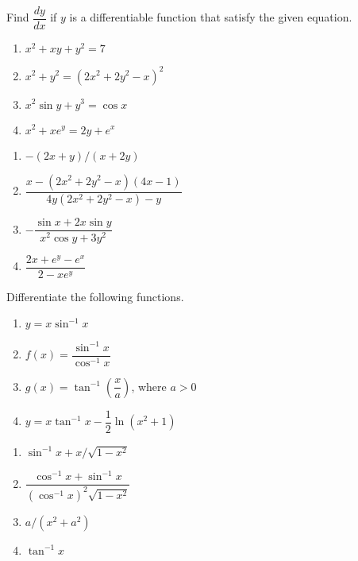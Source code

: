 \begin{enumialphparenastyle}
\begin{ex}
Find $\dfrac{dy}{dx}$ if $y$ is a differentiable
function that satisfy the given equation.
\begin{enumerate}
	\item	$x^2+xy+y^2=7$
	\item	$x^2+y^2=(2x^2+2y^2-x)^2$
	\item	$x^2\sin y+y^3=\cos x$
	\item	$x^2+xe^y=2y+e^x$
\end{enumerate}
\begin{sol}
\begin{enumerate}
	\item	$-(2x+y)/(x+2y)$
	\item	$\dfrac{x-(2x^2+2y^2-x) (4x-1)}{4y(2x^2+2y^2-x)-y}$
	\item	$-\dfrac{\sin x+2x\sin y}{x^2\cos y+3y^2}$
	\item	$\dfrac{2x+e^y-e^x}{2-xe^y}$
\end{enumerate}
\end{sol}
\end{ex}

\begin{ex}
Differentiate the following functions.
\begin{enumerate}
	\item	$y=x\sin^{-1}x$
	\item	$f(x)=\dfrac{\sin^{-1}x}{\cos^{-1}x}$
	\item	$g(x)=\tan^{-1}\left(\dfrac{x}{a}\right)$, where $a>0$
	\item	$y=x\tan^{-1}x-\dfrac{1}{2}\ln(x^2+1)$
\end{enumerate}
\begin{sol}
\begin{enumerate}
	\item	$\sin^{-1}x+x/\sqrt{1-x^2}$
	\item	$\dfrac{\cos^{-1}x+\sin^{-1}x}{(\cos^{-1}x)^2 \sqrt{1-x^2}}$
	\item	$a/(x^2+a^2)$
	\item	$\tan^{-1}x$
\end{enumerate}
\end{sol}
\end{ex}


\end{enumialphparenastyle}